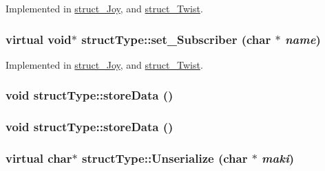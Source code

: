 Implemented in \hyperlink{classstruct__Joy_a775c0f43b9125d8523ed26e72b6ebc44}{struct\_\-Joy}, and \hyperlink{classstruct__Twist_adb9080f278fb0608806c42156f1f9d69}{struct\_\-Twist}.

\hypertarget{classstructType_a2f5adefc54e1e0f5a9100ab78e3c3749}{
\subsubsection[{set\_\-Subscriber}]{\setlength{\rightskip}{0pt plus 5cm}virtual void$\ast$ structType::set\_\-Subscriber (char $\ast$ {\em name})}}
\label{classstructType_a2f5adefc54e1e0f5a9100ab78e3c3749}


Implemented in \hyperlink{classstruct__Joy_a322d144fc1e42403ceb40f1e7f2b8536}{struct\_\-Joy}, and \hyperlink{classstruct__Twist_ae87a3d1851c29e2707ae7bd35fac323b}{struct\_\-Twist}.

\hypertarget{classstructType_aeeef09e0813fb532bd84bbd8010bdd94}{
\subsubsection[{storeData}]{\setlength{\rightskip}{0pt plus 5cm}void structType::storeData ()}}
\label{classstructType_aeeef09e0813fb532bd84bbd8010bdd94}
\hypertarget{classstructType_aeeef09e0813fb532bd84bbd8010bdd94}{
\subsubsection[{storeData}]{\setlength{\rightskip}{0pt plus 5cm}void structType::storeData ()}}
\label{classstructType_aeeef09e0813fb532bd84bbd8010bdd94}
\hypertarget{classstructType_ac89681a3336b2fc76e65435238241db2}{
\subsubsection[{Unserialize}]{\setlength{\rightskip}{0pt plus 5cm}virtual char$\ast$ structType::Unserialize (char $\ast$ {\em maki})}}
\label{classstructType_ac89681a3336b2fc76e65435238241db2}


